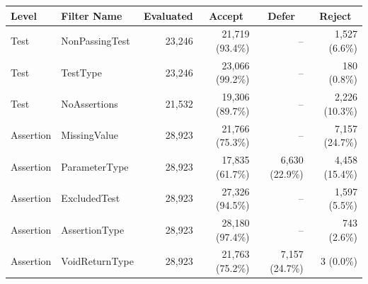   \renewcommand{\theHreporttablerow}{tab-exclusions-filtering.\arabic{reporttablerow}}
  \setcounter{reporttablerow}{0}
  \begin{tabular*}{\linewidth}{@{\hspace{\tabcolsep}\extracolsep{\fill}}llrrrr}
  \toprule
  Level & Filter Name & Evaluated & \multicolumn{1}{c}{Accept} & \multicolumn{1}{c}{Defer} & \multicolumn{1}{c}{Reject} \\
  \midrule
  {reporttablerow}\label{tabrow:tab-exclusions-filtering:Test@3ANonPassingTest}Test & NonPassingTest & 23,246 & 21,719\; (93.4\%) & -- & 1,527\; (\phantom{0}6.6\%) \\
  {reporttablerow}\label{tabrow:tab-exclusions-filtering:Test@3ATestType}Test & TestType & 23,246 & 23,066\; (99.2\%) & -- & 180\; (\phantom{0}0.8\%) \\
  {reporttablerow}\label{tabrow:tab-exclusions-filtering:Test@3ANoAssertions}Test & NoAssertions & 21,532 & 19,306\; (89.7\%) & -- & 2,226\; (10.3\%) \\
  \midrule
  {reporttablerow}\label{tabrow:tab-exclusions-filtering:Assertion@3AMissingValue}Assertion & MissingValue & 28,923 & 21,766\; (75.3\%) & -- & 7,157\; (24.7\%) \\
  {reporttablerow}\label{tabrow:tab-exclusions-filtering:Assertion@3AParameterType}Assertion & ParameterType & 28,923 & 17,835\; (61.7\%) & 6,630\; (22.9\%) & 4,458\; (15.4\%) \\
  {reporttablerow}\label{tabrow:tab-exclusions-filtering:Assertion@3AExcludedTest}Assertion & ExcludedTest & 28,923 & 27,326\; (94.5\%) & -- & 1,597\; (\phantom{0}5.5\%) \\
  {reporttablerow}\label{tabrow:tab-exclusions-filtering:Assertion@3AAssertionType}Assertion & AssertionType & 28,923 & 28,180\; (97.4\%) & -- & 743\; (\phantom{0}2.6\%) \\
  {reporttablerow}\label{tabrow:tab-exclusions-filtering:Assertion@3AVoidReturnType}Assertion & VoidReturnType & 28,923 & 21,763\; (75.2\%) & 7,157\; (24.7\%) & 3\; (\phantom{0}0.0\%) \\
  \bottomrule
  \end{tabular*}
